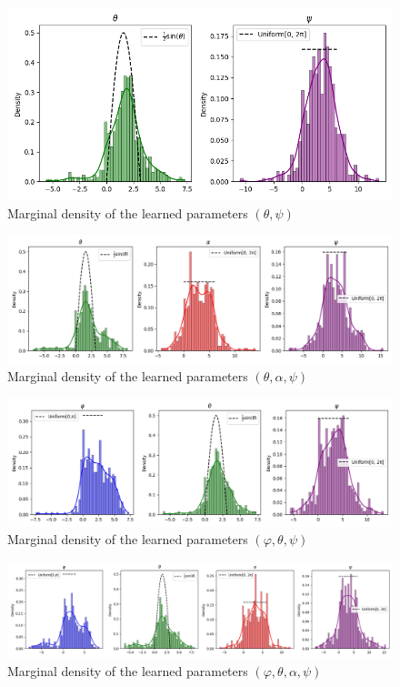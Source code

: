 \documentclass[a4paper,12pt]{article}
\theoremstyle{definition}
\begin{document}
\begin{figure}[H]
    \centering
    \includegraphics[height=0.35\textwidth]{VariableSelectionPsi/theta_psi.png}
    \caption{Marginal density of the learned parameters \((\theta,\psi)\)}
    \label{fig:Distributions5.4}
\end{figure}
\begin{figure}[H]
    \centering
    \includegraphics[height=0.35\textwidth]{VariableSelectionPsi/theta_alpha_psi.png}
    \caption{Marginal density of the learned parameters \((\theta,\alpha,\psi)\)}
    \label{fig:Distributions5.6}
\end{figure}
\begin{figure}[H]
    \centering
    \includegraphics[height=0.35\textwidth]{VariableSelectionPsi/phi_theta_psi.png}
    \caption{Marginal density of the learned parameters \((\varphi,\theta,\psi)\)}
    \label{fig:Distributions5.7}
\end{figure}
\begin{figure}[H]
    \centering
    \includegraphics[width=\textwidth]{VariableSelectionPsi/phi_theta_alpha_psi.png}
    \caption{Marginal density of the learned parameters \((\varphi,\theta,\alpha,\psi)\)}
    \label{fig:Distributions5.8}
\end{figure}
\end{document}

